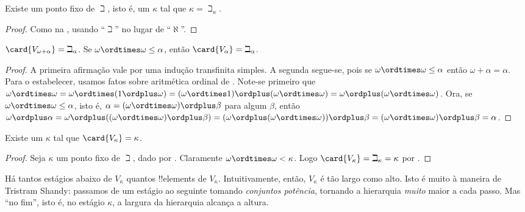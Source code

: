 \documentclass[../../../include/open-logic-section]{subfiles}
\begin{document}
\begin{prop}
Existe um ponto fixo de $\beth$, isto é, um $\kappa$ tal que $\kappa=
\beth_\kappa$.
\end{prop}

\begin{proof}
Como na , usando ``$\beth$'' no lugar de ``$\aleph$''. 
\end{proof}

\begin{prop}
$\card{V_{\omega+\alpha}} = \beth_{\alpha}$. Se $\omega \ordtimes
\omega \leq \alpha$, então $\card{V_\alpha} = \beth_\alpha$.
\end{prop}

\begin{proof}
A primeira afirmação vale por uma indução transfinita simples. A segunda
segue-se, pois se $\omega \ordtimes \omega \leq \alpha$ então
$\omega + \alpha = \alpha$. Para o estabelecer, usamos fatos sobre
aritmética ordinal de . Note-se primeiro
que $\omega \ordtimes \omega = \omega \ordtimes (1 \ordplus \omega) =
(\omega  \ordtimes 1) \ordplus (\omega\ordtimes\omega) = \omega
\ordplus (\omega \ordtimes \omega)$. Ora, se $\omega \ordtimes \omega
\leq \alpha$, isto é, $\alpha = (\omega\ordtimes\omega) \ordplus \beta$
para algum $\beta$, então $\omega \ordplus \alpha = \omega \ordplus
((\omega \ordtimes \omega) \ordplus \beta) = (\omega \ordplus (\omega
\ordtimes \omega)) \ordplus \beta = (\omega \ordtimes \omega) \ordplus
\beta = \alpha$. 
\end{proof}

\begin{cor}
Existe um $\kappa$ tal que $\card{V_\kappa} = \kappa$.
\end{cor}

\begin{proof}
Seja $\kappa$ um ponto fixo de $\beth$, dado por .
Claramente $\omega \ordtimes \omega < \kappa$. Logo $\card{V_\kappa} =
\beth_\kappa= \kappa$ por .
\end{proof}

Há tantos estágios abaixo de $V_\kappa$ quantos !!{element}s
de $V_\kappa$. Intuitivamente, então, $V_\kappa$ é tão largo como alto.
Isto é muito à maneira de Tristram Shandy: passamos de um estágio ao seguinte
tomando \emph{conjuntos potência}, tornando a hierarquia \emph{muito}
maior a cada passo. Mas ``no fim'', isto é, no estágio $\kappa$,
a largura da hierarquia alcança a altura. 
\end{document}
